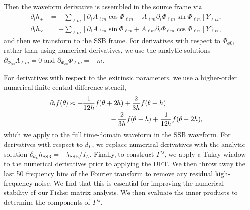 \documentclass[%
 reprint,
 nofootinbib,
 amsmath,amssymb,
 aps,
 prd,
]{revtex4-2}
\begin{document}
Then the waveform derivative is assembled in the source frame via
\begin{subequations} \label{eqn:timeDomainDerivatives}
    \begin{align}
    \partial_i h_+ &= +\sum_{\ell m} \left[ \partial_i A_{\ell m} \cos\Phi_{\ell m} - A_{\ell m} \partial_i \Phi_{\ell m} \sin\Phi_{\ell m}\right] Y^+_{\ell m},
    \\
    \partial_i h_\times &= -\sum_{\ell m} \left[ \partial_i A_{\ell m} \sin\Phi_{\ell m} + A_{\ell m} \partial_i \Phi_{\ell m} \cos\Phi_{\ell m}\right] Y^\times_{\ell m},
    \end{align}
\end{subequations}
and then we transform to the SSB frame. For derivatives with respect to $\Phi_{\phi 0}$, rather than using numerical derivatives, we use the analytic solutions $\partial_{\Phi_{\phi 0}} A_{\ell m} = 0$ and $\partial_{\Phi_{\phi 0}} \Phi_{\ell m} = -m$. 

For derivatives with respect to the extrinsic parameters, we use a higher-order numerical finite central difference stencil,
\begin{align}
    \partial_i f(\theta) &\approx -\frac{1}{12h}f(\theta + 2h) + \frac{2}{3h}f(\theta + h) 
    \\ \notag
    & \qquad \qquad \qquad - \frac{2}{3h}f(\theta - h) + \frac{1}{12h}f(\theta-2h),
\end{align}
which we apply to the full time-domain waveform in the SSB waveform. For derivatives with respect to $d_L$, we replace numerical derivatives with the analytic solution $\partial_{d_L} h_\mathrm{SSB} = -h_\mathrm{SSB}/d_L$. Finally, to construct $\Gamma^{ij}$, we apply a Tukey window to the numerical derivatives prior to applying the DFT. We then throw away the last 50 frequency bins of the Fourier transform to remove any residual high-frequency noise. We find that this is essential for improving the numerical stability of our Fisher matrix analysis. We then evaluate the inner products to determine the components of $\Gamma^{ij}$. 
\end{document}
